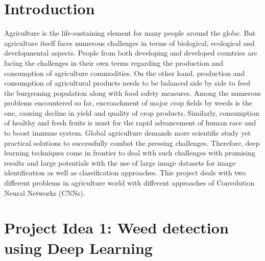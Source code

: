 \documentclass{report}
\begin{document}
\section{Introduction}
Agriculture is the life-sustaining element for many people around the globe. But agriculture itself faces numerous challenges in terms of biological, ecological and developmental aspects. People from both developing and developed countries are facing the challenges in their own terms regarding the production and consumption of agriculture commodities. On the other hand, production and consumption of agricultural products needs to be balanced side by side to feed the burgeoning population along with food safety measures. Among the numerous problems encountered so far, encroachment of major crop fields by weeds is the one, causing decline in yield and quality of crop products. Similarly, consumption of healthy and fresh fruits is must for the rapid advancement of human race and to boost immune system. Global agriculture demands more scientific study yet practical solutions to successfully combat the pressing challenges. Therefore, deep learning techniques come in frontier to deal with such challenges with promising results and large potentials with the use of large image datasets for image identification as well as classification approaches. This project deals with two different problems in agriculture world with different approaches of Convolution Neural Networks (CNNs).  

\section{Project Idea 1: Weed detection using Deep Learning }
\end{document}
